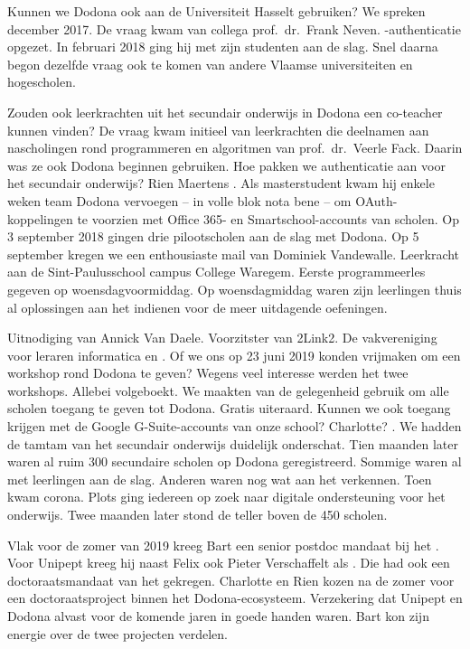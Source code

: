 Kunnen we Dodona ook aan de Universiteit Hasselt gebruiken?
We spreken december 2017.
De vraag kwam van collega prof.\ dr.\ Frank Neven.
-authenticatie opgezet.
In februari 2018 ging hij met zijn studenten aan de slag.
Snel daarna begon dezelfde vraag ook te komen van andere Vlaamse universiteiten en hogescholen.

Zouden ook leerkrachten uit het secundair onderwijs in Dodona een co-teacher kunnen vinden?
De vraag kwam initieel van leerkrachten die deelnamen aan nascholingen rond programmeren en algoritmen van prof.\ dr.\ Veerle Fack.
Daarin was ze ook Dodona beginnen gebruiken.
Hoe pakken we authenticatie aan voor het secundair onderwijs?
Rien Maertens .
Als masterstudent kwam hij enkele weken team Dodona vervoegen -- in volle blok nota bene -- om OAuth-koppelingen te voorzien met Office 365- en Smartschool-accounts van scholen.
Op 3 september 2018 gingen drie pilootscholen aan de slag met Dodona.
Op 5 september kregen we een enthousiaste mail van Dominiek Vandewalle.
Leerkracht  aan de Sint-Paulusschool campus College Waregem.
Eerste programmeerles gegeven op woensdagvoormiddag.
Op woensdagmiddag waren zijn leerlingen thuis al oplossingen aan het indienen voor de meer uitdagende oefeningen.

Uitnodiging van Annick Van Daele.
Voorzitster van 2Link2.
De vakvereniging voor leraren informatica en .
Of we ons op 23 juni 2019 konden vrijmaken om een workshop rond Dodona te geven?
Wegens veel interesse werden het twee workshops.
Allebei volgeboekt.
We maakten van de gelegenheid gebruik om alle scholen toegang te geven tot Dodona.
Gratis uiteraard.
Kunnen we ook toegang krijgen met de Google G-Suite-accounts van onze school?
Charlotte?
.
We hadden de tamtam van het secundair onderwijs duidelijk onderschat.
Tien maanden later waren al ruim 300 secundaire scholen op Dodona geregistreerd.
Sommige waren al met leerlingen aan de slag.
Anderen waren nog wat aan het verkennen.
Toen kwam corona.
Plots ging iedereen op zoek naar digitale ondersteuning voor het onderwijs.
Twee maanden later stond de teller boven de 450 scholen.

Vlak voor de zomer van 2019 kreeg Bart een senior postdoc mandaat bij het \@.
Voor Unipept kreeg hij naast Felix ook Pieter Verschaffelt als .
Die had ook een doctoraatsmandaat van het  gekregen.
Charlotte en Rien kozen na de zomer voor een doctoraatsproject binnen het Dodona-ecosysteem.
Verzekering dat Unipept en Dodona alvast voor de komende jaren in goede handen waren.
Bart kon zijn energie over de twee projecten verdelen.

